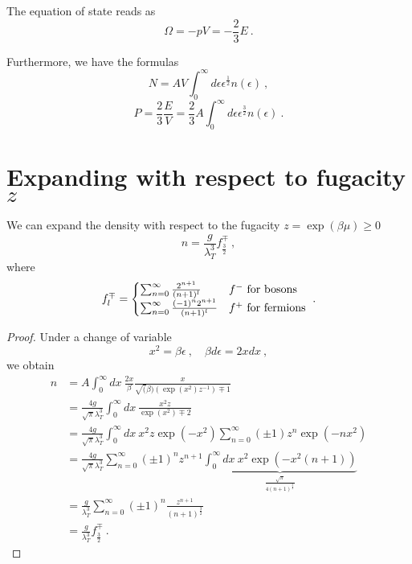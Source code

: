     The equation of state reads as 
    \begin{equation*}
        \Omega = - pV = - \frac{2}{3} E ~.
    \end{equation*}

    Furthermore, we have the formulas 
    \begin{equation*}
        N = AV \int_0^\infty d\epsilon \epsilon^{\frac{1}{2}} n(\epsilon) ~, 
    \end{equation*}
    \begin{equation*}
        P = \frac{2}{3} \frac{E}{V} = \frac{2}{3} A \int_0^\infty d\epsilon \epsilon^{\frac{3}{2}} n(\epsilon) ~.
    \end{equation*}

\section{Expanding with respect to fugacity $z$}

    We can expand the density with respect to the fugacity $z = \exp(\beta \mu) \geq 0$
    \begin{equation*}
        n = \frac{g}{\lambda_T^3} f^\mp_{\frac{3}{2}} ~,
    \end{equation*}
    where 
    \begin{equation*}
        f^\mp_l = \begin{cases}
            \sum_{n=0}^\infty \frac{2^{n+1}}{(n+1)^l} & f^- \textnormal{ for bosons} \\
            \sum_{n=0}^\infty \frac{(-1)^n 2^{n+1}}{(n+1)^l} & f^+ \textnormal{ for fermions}
        \end{cases} ~.
    \end{equation*}
    \begin{proof}
        Under a change of variable 
        \begin{equation*}
            x^2 = \beta \epsilon ~, \quad \beta d \epsilon = 2 x dx ~,
        \end{equation*}
        we obtain 
        \begin{equation*}
        \begin{aligned}
            n & = A \int_0^\infty dx ~\frac{2x}{\beta} \frac{x}{\sqrt(\beta) (\exp(x^2) z^{-1}) \mp 1} \\ & = \frac{4 g}{\sqrt{\pi} \lambda_T^3} \int_0^\infty dx ~ \frac{x^2 z}{\exp(x^2) \mp 2} \\ & = \frac{4g}{\sqrt{\pi} \lambda_T^3} \int_0^\infty dx ~ x^2 z \exp(- x^2) \sum_{n=0}^\infty (\pm 1) z^n \exp(- n x^2) \\ & = \frac{4g}{\sqrt{\pi} \lambda_T^3} \sum_{n=0}^\infty (\pm 1)^n z^{n+1} \underbrace{\int_0^\infty dx ~ x^2 \exp(- x^2 (n+1)) }_{\frac{\sqrt{\pi}}{4 (n+1)^{\frac{3}{2}}}} \\ & = \frac{g}{\lambda_T^3} \sum_{n=0}^\infty (\pm 1)^n \frac{z^{n+1}}{(n+1)^{\frac{3}{2}}} \\ & = \frac{g}{\lambda_T^3} f^\mp_{\frac{3}{2}} ~.
        \end{aligned}
        \end{equation*}
    \end{proof}


